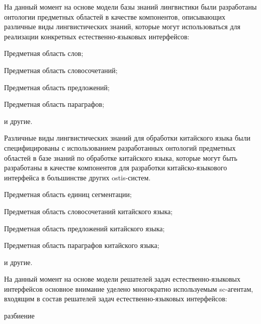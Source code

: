 На данный момент на основе модели базы знаний лингвистики были разработаны онтологии предметных областей в качестве компонентов, описывающих различные виды лингвистических знаний, которые могут использоваться для реализации конкретных естественно-языковых интерфейсов:
\begin{scnitemize}
	\item Предметная область слов;
	\item Предметная область словосочетаний;
	\item Предметная область предложений;
	\item Предметная область параграфов;
	\item и другие.
\end{scnitemize}

Различные виды лингвистических знаний для обработки китайского языка были специфицированы с использованием разработанных онтологий предметных областей в базе знаний по обработке китайского языка, которые могут быть разработаны в качестве компонентов для разработки китайско-языкового интерфейса в большинстве других ostis-систем.
\begin{scnitemize}
	\item Предметная область единиц сегментации;
	\item Предметная область словосочетаний китайского языка;
	\item Предметная область предложений китайского языка;
	\item Предметная область параграфов китайского языка;
	\item и другие.
\end{scnitemize}

На данный момент на основе модели решателей задач естественно-языковых интерфейсов основное внимание уделено многократно используемым sc-агентам, входящим в состав решателей задач естественно-языковых интерфейсов:
\begin{SCn}
	\begin{scnrelfromset}{разбиение}
	\end{scnrelfromset}
\end{SCn}

